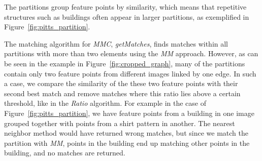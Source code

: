 \documentclass{article}
\begin{document}
The partitions group feature points by similarity, which means that 
repetitive structures such as buildings often appear in larger 
partitions, as exemplified in Figure~\ref{fig:pitts_partition}.
%
%		
%

The matching algorithm for \emph{MMC}, \emph{getMatches}, finds matches 
within all partitions with more than two elements using the \emph{MM} 
approach.  However, as can be seen in the example in 
Figure~\ref{fig:cropped_graph}, many of the partitions contain only two 
feature points from different images linked by one edge. In such a case, 
we compare the similarity of the these two feature points with their 
second best match and remove matches where this ratio lies above a 
certain threshold, like in the \emph{Ratio} algorithm. For example in the 
case of Figure~\ref{fig:pitts_partition}, we have feature points from a 
building in one image grouped together with points from a shirt pattern 
in another.  The nearest neighbor method would have returned wrong 
matches, but since we match the partition with \emph{MM}, points in the 
building end up matching other points in the building, and no matches 
are returned.
\end{document}
